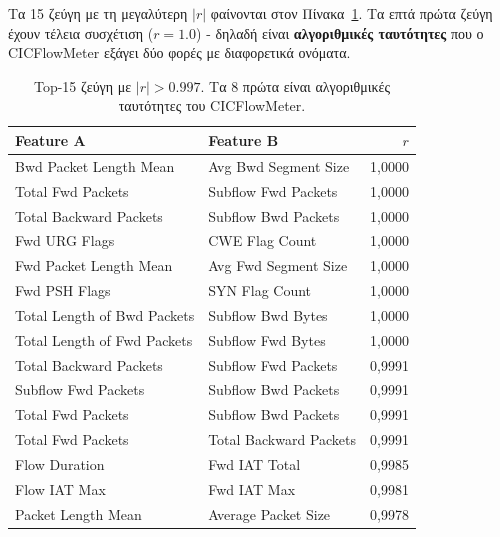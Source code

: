 \documentclass[12pt,a4paper,twoside]{book}
\begin{document}
Τα 15 ζεύγη με τη μεγαλύτερη \(|r|\) φαίνονται στον
Πίνακα~\ref{tab:top_correlated}. Τα επτά πρώτα ζεύγη έχουν τέλεια
συσχέτιση (\(r=1.0\)) - δηλαδή είναι \textbf{αλγοριθμικές ταυτότητες}
που ο CICFlowMeter εξάγει δύο φορές με διαφορετικά ονόματα.

\begin{table}[H]
    \centering
    \small
    \begin{tabular}{llr}
        \toprule
        \textbf{Feature A}            & \textbf{Feature B}           & \textbf{\(r\)} \\
        \midrule
        Bwd Packet Length Mean        & Avg Bwd Segment Size         & 1,0000         \\
        Total Fwd Packets             & Subflow Fwd Packets          & 1,0000         \\
        Total Backward Packets        & Subflow Bwd Packets          & 1,0000         \\
        Fwd URG Flags                 & CWE Flag Count               & 1,0000         \\
        Fwd Packet Length Mean        & Avg Fwd Segment Size         & 1,0000         \\
        Fwd PSH Flags                 & SYN Flag Count               & 1,0000         \\
        Total Length of Bwd Packets   & Subflow Bwd Bytes            & 1,0000         \\
        Total Length of Fwd Packets   & Subflow Fwd Bytes            & 1,0000         \\
        Total Backward Packets        & Subflow Fwd Packets          & 0,9991         \\
        Subflow Fwd Packets           & Subflow Bwd Packets          & 0,9991         \\
        Total Fwd Packets             & Subflow Bwd Packets          & 0,9991         \\
        Total Fwd Packets             & Total Backward Packets       & 0,9991         \\
        Flow Duration                 & Fwd IAT Total                & 0,9985         \\
        Flow IAT Max                  & Fwd IAT Max                  & 0,9981         \\
        Packet Length Mean            & Average Packet Size          & 0,9978         \\
        \bottomrule
    \end{tabular}
    \caption{Top-15 ζεύγη με \(|r| > 0.997\). Τα 8 πρώτα είναι
    αλγοριθμικές ταυτότητες του CICFlowMeter.}\label{tab:top_correlated}
\end{table}
\end{document}
